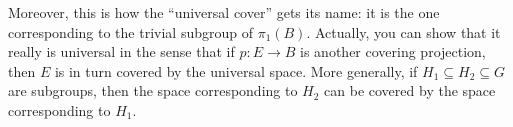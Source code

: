 Moreover, this is how the ``universal cover'' gets its name:
it is the one corresponding to the trivial subgroup of $\pi_1(B)$.
Actually, you can show that it really is universal in the sense
that if $p : E \to B$ is another covering projection,
then $E$ is in turn covered by the universal space.
More generally, if $H_1 \subseteq H_2 \subseteq G$ are subgroups,
then the space corresponding to $H_2$ can be covered by the space
corresponding to $H_1$.


\section{\problemhead}
